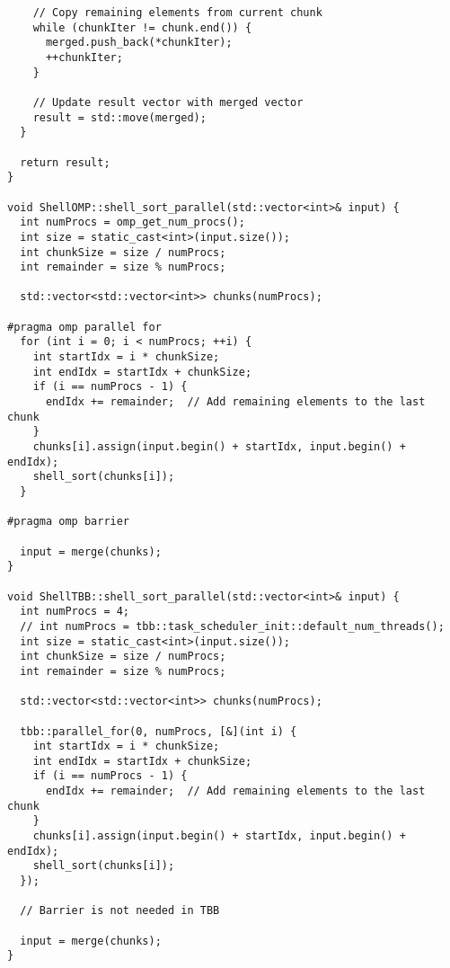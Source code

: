 \documentclass[]{article}
\theoremstyle{remark}
\theoremstyle{definition}
\begin{document}
\begin{verbatim}
    // Copy remaining elements from current chunk
    while (chunkIter != chunk.end()) {
      merged.push_back(*chunkIter);
      ++chunkIter;
    }

    // Update result vector with merged vector
    result = std::move(merged);
  }

  return result;
}

void ShellOMP::shell_sort_parallel(std::vector<int>& input) {
  int numProcs = omp_get_num_procs();
  int size = static_cast<int>(input.size());
  int chunkSize = size / numProcs;
  int remainder = size % numProcs;

  std::vector<std::vector<int>> chunks(numProcs);

#pragma omp parallel for
  for (int i = 0; i < numProcs; ++i) {
    int startIdx = i * chunkSize;
    int endIdx = startIdx + chunkSize;
    if (i == numProcs - 1) {
      endIdx += remainder;  // Add remaining elements to the last chunk
    }
    chunks[i].assign(input.begin() + startIdx, input.begin() + endIdx);
    shell_sort(chunks[i]);
  }

#pragma omp barrier

  input = merge(chunks);
}

void ShellTBB::shell_sort_parallel(std::vector<int>& input) {
  int numProcs = 4;
  // int numProcs = tbb::task_scheduler_init::default_num_threads();
  int size = static_cast<int>(input.size());
  int chunkSize = size / numProcs;
  int remainder = size % numProcs;

  std::vector<std::vector<int>> chunks(numProcs);

  tbb::parallel_for(0, numProcs, [&](int i) {
    int startIdx = i * chunkSize;
    int endIdx = startIdx + chunkSize;
    if (i == numProcs - 1) {
      endIdx += remainder;  // Add remaining elements to the last chunk
    }
    chunks[i].assign(input.begin() + startIdx, input.begin() + endIdx);
    shell_sort(chunks[i]);
  });

  // Barrier is not needed in TBB

  input = merge(chunks);
}
\end{verbatim}
\end{document}
